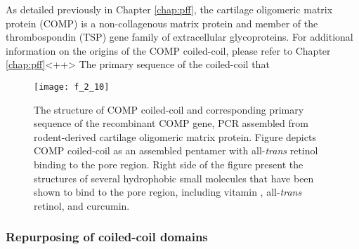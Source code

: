 \begin{refsection}
As detailed previously in Chapter \ref{chap:pff}, the cartilage oligomeric
matrix protein (COMP) is a non-collagenous matrix protein and member of the
thrombospondin (TSP) gene family of extracellular
glycoproteins.\cite{Adams2001,Smith1997,Muller1998,Hedbom1992,Oldberg1992}
For additional information on the origins of the COMP coiled-coil, please refer
to Chapter \ref{chap:pff}<++>
The primary sequence of the coiled-coil that 
\begin{figure}[h!] \centering \texttt{[image: f\_2\_10]}
    \caption[The structure of COMP coiled-coil and corresponding primary
        sequence of the recombinant COMP gene, PCR assembled from rodent-derived
        cartilage oligomeric matrix protein. Figure depicts COMP coiled-coil as
        an assembled pentamer with all-\emph{trans} retinol binding to the pore
    region.  Right side of the figure present the structures of several
hydrophobic small molecules that have been shown to bind to the pore region,
including vitamin , all-\emph{trans} retinol, and curcumin.] {The
    structure of COMP coiled-coil and corresponding primary sequence of the
    recombinant COMP gene, PCR assembled from rodent-derived cartilage
    oligomeric matrix protein. Figure depicts COMP coiled-coil as an assembled
    pentamer with all-\emph{trans} retinol binding to the pore region.  Right
    side of the figure present the structures of several hydrophobic small
    molecules that have been shown to bind to the pore region, including vitamin
    , all-\emph{trans} retinol, and
    curcumin.\cite{Gunasekar2009}}\label{fig:our_COMP} \end{figure}
\subsubsection{Repurposing of coiled-coil domains}


\end{refsection}
